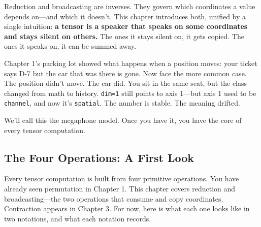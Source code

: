 \documentclass[11pt,titlepage]{article}
\begin{document}
Reduction and broadcasting are inverses. They govern which coordinates a
value depends on---and which it doesn't. This chapter introduces both,
unified by a single intuition: \textbf{a tensor is a speaker that speaks
on some coordinates and stays silent on others.} The ones it stays
silent on, it gets copied. The ones it speaks on, it can be summed away.

Chapter 1's parking lot showed what happens when a position moves: your
ticket says D-7 but the car that was there is gone. Now face the more
common case. The position didn't move. The car did. You sit in the same
seat, but the class changed from math to history. \texttt{dim=1} still
points to axis 1---but axis 1 used to be \texttt{channel}, and now it's
\texttt{spatial}. The number is stable. The meaning drifted.

We'll call this the megaphone model. Once you have it, you have the core
of every tensor computation.

\vspace{2em}

\hypertarget{the-four-operations-a-first-look}{%
\subsection{The Four Operations: A First
Look}\label{the-four-operations-a-first-look}}

Every tensor computation is built from four primitive operations. You
have already seen permutation in Chapter 1. This chapter covers
reduction and broadcasting---the two operations that consume and copy
coordinates. Contraction appears in Chapter 3. For now, here is what
each one looks like in two notations, and what each notation records.
\end{document}
